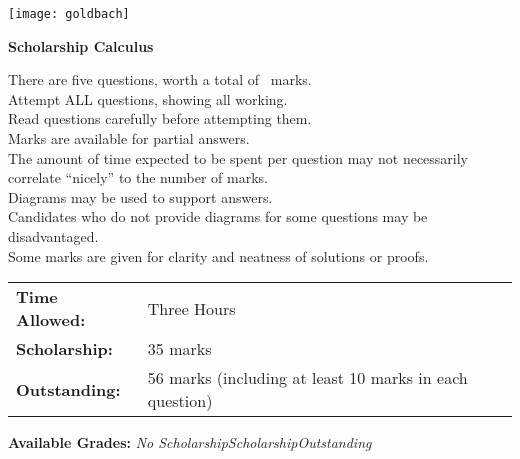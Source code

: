 \documentclass[addpoints,a4paper]{exam}
\begin{document}
\begin{coverpages}

\begin{center}
  \texttt{[image: goldbach]}

  \vspace{5mm}

  \textbf{\Huge{Scholarship Calculus}}
\end{center}

\vspace{5mm}

\noindent
\large{There are five questions, worth a total of \numpoints\ marks.\\
       Attempt ALL questions, showing all working.\\
       Read questions carefully before attempting them.\\
       Marks are available for partial answers.\\
       The amount of time expected to be spent per question may not necessarily correlate ``nicely'' to the number of marks.\\
       Diagrams may be used to support answers.\\
       Candidates who do not provide diagrams for some questions may be disadvantaged.\\
       Some marks are given for clarity and neatness of solutions or proofs.}
\vspace{2mm}

\begin{tabular}{ll}
  \textbf{Time Allowed:}& Three Hours\\
  \textbf{Scholarship:}& 35 marks\\
  \textbf{Outstanding:}& 56 marks (including at least 10 marks in each question)
\end{tabular}

\vfill

\begin{center}
  \gradetable[h][questions]
  \vspace{2mm}

  \textbf{Available Grades:} \textit{No Scholarship}\quad\textit{Scholarship}\quad\textit{Outstanding}
\end{center}

\end{coverpages}
\end{document}
